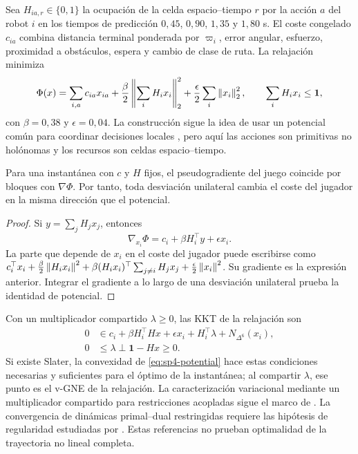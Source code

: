 Sea $H_{ia,r}\in\{0,1\}$ la ocupaci\'on de la celda espacio--tiempo $r$ por la
acci\'on $a$ del robot $i$ en los tiempos de predicci\'on
$0{,}45$, $0{,}90$, $1{,}35$ y $1{,}80$ s. El coste congelado $c_{ia}$ combina
distancia terminal ponderada por $\varpi_i$, error angular, esfuerzo, proximidad
a obst\'aculos, espera y cambio de clase de ruta. La relajaci\'on minimiza
\begin{equation}
 \Phi(x)=
 \sum_{i,a}c_{ia}x_{ia}
 +\frac{\beta}{2}\left\|\sum_i H_i x_i\right\|_2^2
 +\frac{\epsilon}{2}\sum_i\left\lVert x_i\right\rVert_2^2,
 \qquad
 \sum_i H_i x_i\leq\mathbf 1 ,
 \label{eq:sp4-potential}
\end{equation}
con $\beta=0{,}38$ y $\epsilon=0{,}04$. La construcci\'on sigue la idea de usar
un potencial com\'un para coordinar decisiones locales
\citep{monderer1996potential,hurtado2024potential}, pero aqu\'i las acciones son
primitivas no hol\'onomas y los recursos son celdas espacio--tiempo.

\begin{proposicion}
Para una instant\'anea con $c$ y $H$ fijos, el pseudogradiente del juego coincide
por bloques con $\nabla\Phi$. Por tanto, toda desviaci\'on unilateral cambia el
coste del jugador en la misma direcci\'on que el potencial.
\end{proposicion}
\begin{proof}
Si $y=\sum_jH_jx_j$, entonces
\[
 \nabla_{x_i}\Phi=c_i+\beta H_i^\top y+\epsilon x_i.
\]
La parte que depende de $x_i$ en el coste del jugador puede escribirse como
$c_i^\top x_i+\frac{\beta}{2}\left\lVert H_ix_i\right\rVert^2+
\beta(H_ix_i)^\top\sum_{j\neq i}H_jx_j+
\frac{\epsilon}{2}\left\lVert x_i\right\rVert^2$. Su gradiente es la expresi\'on anterior.
Integrar el gradiente a lo largo de una desviaci\'on unilateral prueba la
identidad de potencial.
\end{proof}

Con un multiplicador compartido $\lambda\geq0$, las KKT de la relajaci\'on son
\begin{equation}
\begin{aligned}
 0&\in c_i+\beta H_i^\top Hx+\epsilon x_i+H_i^\top\lambda
       +N_{\Delta^6}(x_i),\\
 0&\leq\lambda\perp\mathbf1-Hx\geq0 .
\end{aligned}
\label{eq:sp4-kkt}
\end{equation}
Si existe Slater, la convexidad de \eqref{eq:sp4-potential} hace estas condiciones
necesarias y suficientes para el \'optimo de la instant\'anea; al compartir
$\lambda$, ese punto es el v-GNE de la relajaci\'on. La caracterizaci\'on variacional
mediante un multiplicador compartido para restricciones acopladas sigue el marco de
\citet{yi2019operator}. La convergencia de din\'amicas primal--dual restringidas
requiere las hip\'otesis de regularidad estudiadas por
\citet{cherukuri2016primaldual}. Estas referencias no prueban optimalidad de la
trayectoria no lineal completa.

